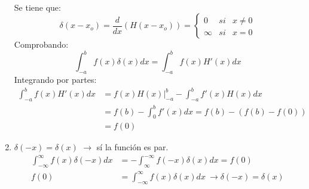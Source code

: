 \documentclass[../main]{subfiles}
\begin{document}
\begin{enumerate}
\begin{minipage}{0.5\textwidth}
    \end{minipage}\\[0.5cm]
    Se tiene que:
    \begin{equation}
        \delta(x-x_o)=\dfrac{d}{dx}\left( H(x-x_o)\right)=
        \left\{ 
        \begin{array}{lll}
             0 & si & x\neq0 \\
             \infty & si & x=0 
        \end{array} 
        \right. 
    \end{equation}
    Comprobando:
    \begin{equation*}
        \int_{-a}^b f(x)\delta(x)dx=\int_{-a}^b f(x)H'(x)dx
    \end{equation*}
    Integrando por partes:
    \begin{align*}
        \int_{-a}^b f(x)H'(x)dx &=f(x) H(x)\Big|_{-a}^b- \int_{-a}^b f'(x)H(x)dx \\
        &=f(b)-\int_0^b f'(x)dx=f(b)-(f(b)-f(0)) \\
        &=f(0)
    \end{align*}
    \item $\delta(-x)=\delta(x)$ $\rightarrow$ sí la función es par.
    \begin{align*}
        \int_{-\infty}^{\infty} f(x) \delta(-x)dx&=-\int_{\infty}^{-\infty} f(-x) \delta(x)dx=f(0) \\
        f(0)&=\int_{-\infty}^{\infty} f(x) \delta(x)dx \ \rightarrow \delta(-x)=\delta(x)
    \end{align*}
    
\end{enumerate}
\end{document}
